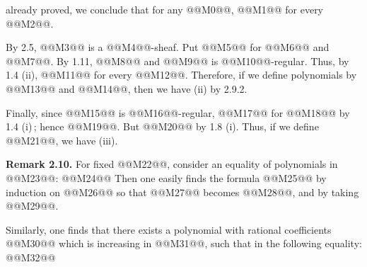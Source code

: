 already proved, we conclude that for any @@M0@@,
@@M1@@
for every @@M2@@.

By 2.5, @@M3@@ is a @@M4@@-sheaf. Put @@M5@@ for @@M6@@ and @@M7@@. By 1.11, @@M8@@ and @@M9@@ is @@M10@@-regular. Thus, by 1.4 (ii), @@M11@@ for every @@M12@@. Therefore, if we define polynomials by @@M13@@ and @@M14@@, then we have (ii) by 2.9.2.

Finally, since @@M15@@ is @@M16@@-regular, @@M17@@ for @@M18@@ by 1.4 (i)\,; hence @@M19@@. But @@M20@@ by 1.8 (i). Thus, if we define @@M21@@, we have (iii).

\textbf{Remark 2.10.} For fixed @@M22@@, consider an equality of polynomials in @@M23@@:
@@M24@@
Then one easily finds the formula
@@M25@@
by induction on @@M26@@ so that @@M27@@ becomes @@M28@@, and by taking @@M29@@.

Similarly, one finds that there exists a polynomial with rational coefficients @@M30@@ which is increasing in @@M31@@, such that in the following equality:
@@M32@@
